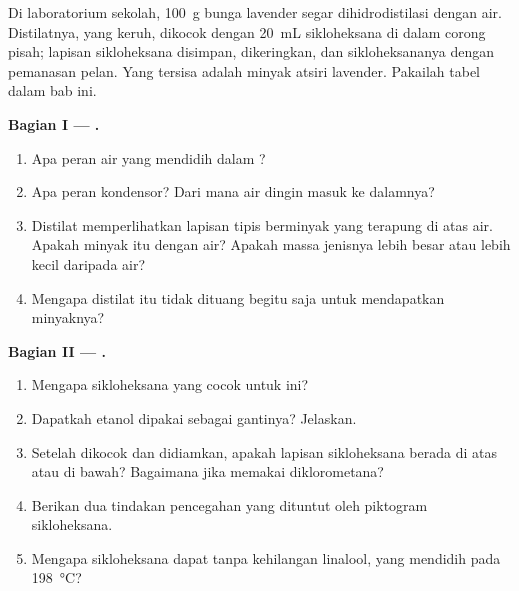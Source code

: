 \begin{problem}
\label{pb:g10:chemical-species:1}
Di laboratorium sekolah, \qty{100}{g} bunga lavender segar
dihidrodistilasi dengan air. Distilatnya, yang keruh, dikocok dengan
\qty{20}{mL} sikloheksana di dalam corong pisah; lapisan sikloheksana
disimpan, dikeringkan, dan sikloheksananya  dengan pemanasan
pelan. Yang tersisa adalah minyak atsiri lavender. Pakailah tabel
 dalam bab ini.

\medskip
\noindent\textbf{Bagian I --- .}
\begin{enumerate}
  \item Apa peran air yang mendidih dalam ?
  \item Apa peran kondensor? Dari mana air dingin masuk ke dalamnya?
  \item Distilat memperlihatkan lapisan tipis berminyak yang terapung di
        atas air. Apakah minyak itu  dengan air? Apakah
        massa jenisnya lebih besar atau lebih kecil daripada air?
  \item Mengapa distilat itu tidak dituang begitu saja untuk mendapatkan
        minyaknya?
\end{enumerate}

\medskip
\noindent\textbf{Bagian II --- .}
\begin{enumerate}[resume]
  \item Mengapa sikloheksana  yang cocok untuk  ini?
  \item Dapatkah etanol dipakai sebagai gantinya? Jelaskan.
  \item Setelah dikocok dan didiamkan, apakah lapisan sikloheksana berada
        di atas atau di bawah? Bagaimana jika memakai diklorometana?
  \item Berikan dua tindakan pencegahan yang dituntut oleh piktogram
        sikloheksana.
  \item Mengapa sikloheksana dapat  tanpa kehilangan linalool,
        yang mendidih pada \qty{198}{\celsius}?
\end{enumerate}


\end{problem}
